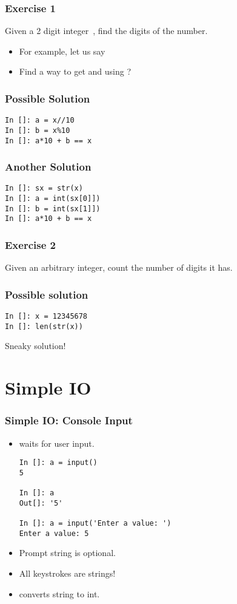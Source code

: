 \documentclass[14pt,compress]{beamer}
\begin{document}
\begin{frame}
  \frametitle{Exercise 1}
  Given a 2 digit integer\ , find the digits of the number.
  \vspace*{1em}

  \begin{itemize}
  \item For example, let us say 
  \item Find a way to get  and  using ?
  \end{itemize}

\end{frame}

\begin{frame}[fragile]
  \frametitle{Possible Solution}
\begin{lstlisting}
In []: a = x//10
In []: b = x%10
In []: a*10 + b == x
\end{lstlisting}
\end{frame}

\begin{frame}[fragile]
  \frametitle{Another Solution}
\begin{lstlisting}
In []: sx = str(x)
In []: a = int(sx[0]])
In []: b = int(sx[1]])
In []: a*10 + b == x
\end{lstlisting}
\end{frame}


\begin{frame}
  \frametitle{Exercise 2}
  Given an arbitrary integer, count the number of digits it has.
\end{frame}

\begin{frame}[fragile]
\frametitle{Possible solution}
\begin{lstlisting}
In []: x = 12345678
In []: len(str(x))
\end{lstlisting}

  Sneaky solution!
\end{frame}



\section{Simple IO}
\begin{frame}[fragile]
  \frametitle{Simple IO: Console Input}
  \small
  \begin{itemize}
    \item {} waits for user input.
      \begin{lstlisting}
In []: a = input()
5

In []: a
Out[]: '5'

In []: a = input('Enter a value: ')
Enter a value: 5
      \end{lstlisting}
    \item Prompt string is optional.
    \item All keystrokes are strings!
    \item {} converts string to int.
  \end{itemize}
\end{frame}
\end{document}
